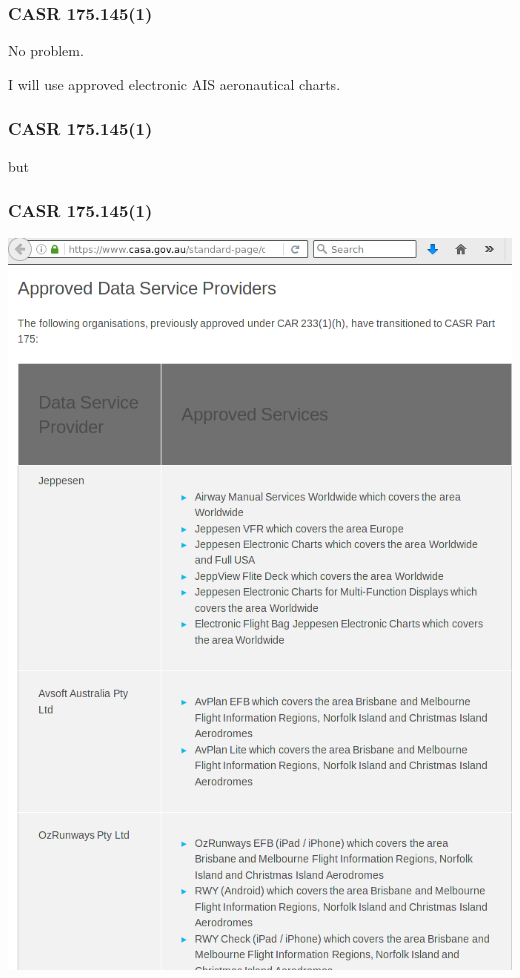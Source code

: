 \begin{frame}
\frametitle{CASR 175.145(1)}
\large
\begin{center}
No problem.
\par
I will use approved electronic AIS aeronautical charts.
\end{center}
\end{frame}

\begin{frame}
\frametitle{CASR 175.145(1)}
\large
\begin{center}
but
\end{center}
\end{frame}

\begin{frame}
\frametitle{CASR 175.145(1)}
\begin{center}
\includegraphics[height=0.8\textheight,natwidth=680,natheight=987]{image/casa-approved-data-service-providers.png}
\end{center}
\end{frame}

